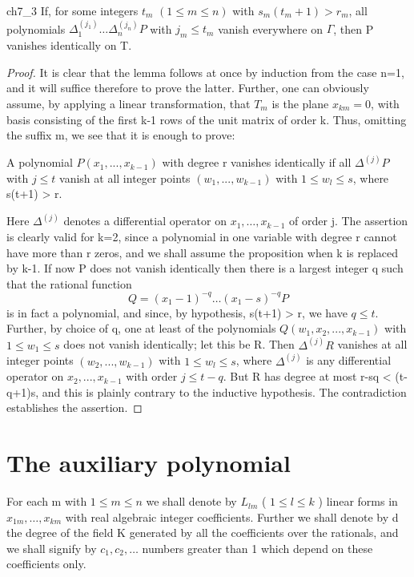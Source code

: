 \begin{mylemma}{}{ch7_3}
If, for some integers  $t_m$   $(1 \le m \le n)$  with  $s_m(t_m+1) > r_m$, all polynomials  $\Delta_1^{(j_1)} \dots \Delta_n^{(j_n)} P$  with  $j_m \le t_m$  vanish everywhere on  $\Gamma$, then P vanishes identically on T.
\end{mylemma}

\begin{proof}
It is clear that the lemma follows at once by induction from the case n=1, and it will suffice therefore to prove the latter. Further, one can obviously assume, by applying a linear transformation, that  $T_m$  is the plane  $x_{km}=0$, with basis consisting of the first k-1 rows of the unit matrix of order k. Thus, omitting the suffix m, we see that it is enough to prove:

A polynomial  $P(x_1, ..., x_{k-1})$  with degree r vanishes identically if all  $\Delta^{(j)}P$  with  $j \leq t$  vanish at all integer points  $(w_1, ..., w_{k-1})$  with  $1 \leq w_l \leq s$, where s(t+1) > r.

Here  $\Delta^{(j)}$  denotes a differential operator on  $x_1, \ldots, x_{k-1}$  of order j. The assertion is clearly valid for k=2, since a polynomial in one variable with degree r cannot have more than r zeros, and we shall assume the proposition when k is replaced by k-1. If now P does not vanish identically then there is a largest integer q such that the rational function
\[ Q = (x_1 - 1)^{-q} \dots (x_1 - s)^{-q} P \]
is in fact a polynomial, and since, by hypothesis, s(t+1) > r, we have  $q \le t$. Further, by choice of q, one at least of the polynomials  $Q(w_1, x_2, ..., x_{k-1})$  with  $1 \le w_1 \le s$  does not vanish identically; let this be R. Then  $\Delta^{(j)}R$  vanishes at all integer points  $(w_2, ..., w_{k-1})$  with  $1 \le w_l \le s$, where  $\Delta^{(j)}$  is any differential operator on  $x_2, ..., x_{k-1}$ with order  $j \le t-q$. But R has degree at most r-sq < (t-q+1)s, and this is plainly contrary to the inductive hypothesis. The contradiction establishes the assertion.
\end{proof}

\section{The auxiliary polynomial}\label{sec:ch7_6}

For each m with  $1 \le m \le n$  we shall denote by  $L_{lm}$  ( $1 \le l \le k$ ) linear forms in  $x_{1m}, \ldots, x_{km}$  with real algebraic integer coefficients. Further we shall denote by d the degree of the field K generated by all the coefficients over the rationals, and we shall signify by  $c_1, c_2, \ldots$  numbers greater than 1 which depend on these coefficients only.

